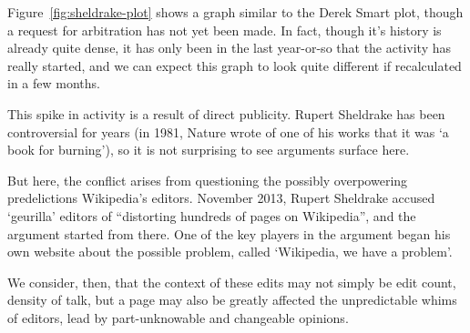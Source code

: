 Figure~\ref{fig:sheldrake-plot} shows a graph similar to the Derek
Smart plot, though a request for arbitration has not yet been made. In
fact, though it's history is already quite dense, it has only been in
the last year-or-so that the activity has really started, and we can
expect this graph to look quite different if recalculated in a few
months.

This spike in activity is a result of direct publicity. Rupert
Sheldrake has been controversial for years (in 1981, Nature wrote of
one of his works that it was `a book for burning'), so it is not
surprising to see arguments surface here. 

But here, the conflict arises from questioning the possibly
overpowering predelictions Wikipedia's editors. November 2013, Rupert
Sheldrake accused `geurilla' editors of ``distorting hundreds of pages
on Wikipedia''\cite{sheldrake-bbc-interview}, and the argument started
from there. One of the key players in the argument began his own
website about the possible problem, called `Wikipedia, we have a
problem'.\cite{wiki-problem}

We consider, then, that the context of these edits may not simply be
edit count, density of talk, but a page may also be greatly affected
the unpredictable whims of editors, lead by part-unknowable and
changeable opinions.
